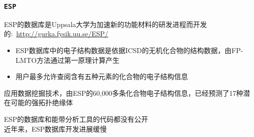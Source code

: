\frame
{
\frametitle{\tt{ESP}}
\textrm{ESP}的数据库是\textrm{Uppsala}大学为加速新的功能材料的研发进程而开发的:~\url{http://gurka.fysik.uu.se/ESP/}
\begin{itemize}
	\item \textrm{ESP}数据库中的电子结构数据是依据\textrm{ICSD}的无机化合物的结构数据，由\textrm{FP-LMTO}方法通过第一原理计算产生\\
{\fontsize{6.5pt}{4.2pt}}
\item 用户最多允许查阅含有五种元素的化合物的电子结构信息
\end{itemize}
应用数据挖掘技术，由\textrm{ESP}的\textrm{60,000}多条化合物电子结构信息，已经预测了17种潜在可能的强拓扑绝缘体\\%
{\fontsize{7.5pt}{4.2pt}}

\textrm{ESP}的数据库和能带分析工具的代码都没有公开\\
近年来，\textrm{ESP}数据库开发进展缓慢
}

